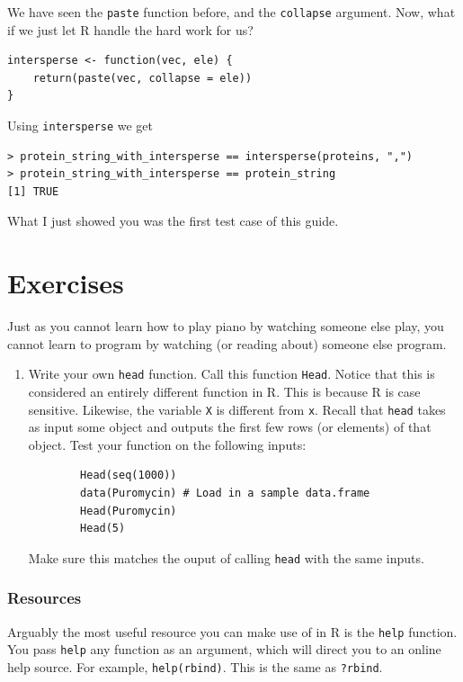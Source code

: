 \documentclass[12pt]{article}
\theoremstyle{remark}
\begin{document}
We have seen the \verb|paste| function before, and the \verb|collapse| argument. Now, what if we just let R handle the hard work for us?

\begin{Verbatim}[frame=single, fontsize=\small]
intersperse <- function(vec, ele) {
	return(paste(vec, collapse = ele))
}
\end{Verbatim}

Using \verb|intersperse| we get
\begin{verbatim}
> protein_string_with_intersperse == intersperse(proteins, ",")
> protein_string_with_intersperse == protein_string
[1] TRUE
\end{verbatim}
What I just showed you was the first test case of this guide.

\newpage
\part{Exercises}

Just as you cannot learn how to play piano by watching someone else play, you cannot learn to program by watching (or reading about) someone else program.

\begin{enumerate}
	\item { Write your own \verb|head| function. Call this function \verb|Head|. Notice that this is considered an entirely different function in R. This is because R is case sensitive. Likewise, the variable \verb|X| is different from \verb|x|. Recall that \verb|head| takes as input some object and outputs the first few rows (or elements) of that object. Test your function on the following inputs:
	\begin{verbatim}
		Head(seq(1000))
		data(Puromycin) # Load in a sample data.frame
		Head(Puromycin)
		Head(5)
	\end{verbatim}
	Make sure this matches the ouput of calling \verb|head| with the same inputs.
	}

\end{enumerate}


\clearpage
\section{Resources}
Arguably the most useful resource you can make use of in R is the \verb|help| function. You pass \verb|help| any function as an argument, which will direct you to an online help source. For example, \verb|help(rbind)|. This is the same as \verb|?rbind|.
\end{document}
